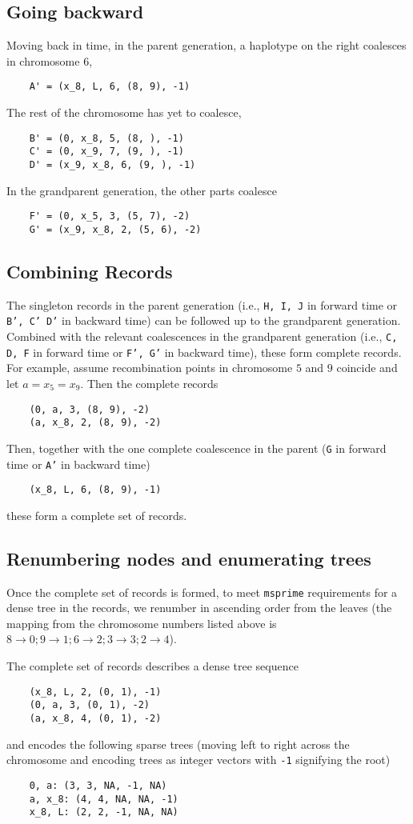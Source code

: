 \documentclass[12pt]{article}
\begin{document}
\subsection*{Going backward}
Moving back in time, in the parent generation, a haplotype on the right coalesces
in chromosome $6$,
\begin{verbatim}
	A' = (x_8, L, 6, (8, 9), -1)
\end{verbatim}
The rest of the chromosome has yet to coalesce,
\begin{verbatim}
	B' = (0, x_8, 5, (8, ), -1)
	C' = (0, x_9, 7, (9, ), -1)
	D' = (x_9, x_8, 6, (9, ), -1)
\end{verbatim}

In the grandparent generation, the other parts coalesce
\begin{verbatim}
	F' = (0, x_5, 3, (5, 7), -2)
	G' = (x_9, x_8, 2, (5, 6), -2)
\end{verbatim}

\subsection*{Combining Records}

The singleton records in the parent generation (i.e., {\tt H, I, J} in forward
time or {\tt B', C' D'} in backward time) can be followed up to the grandparent generation.
Combined with the relevant coalescences in the grandparent generation (i.e.,
{\tt C, D, F} in forward time or {\tt F', G'} in backward time), these form complete records.
For example, assume recombination points in chromosome $5$ and $9$ coincide and let $a = x_5 =x_9$.
Then the complete records
\begin{verbatim}
	(0, a, 3, (8, 9), -2)
	(a, x_8, 2, (8, 9), -2)
\end{verbatim}
Then, together with the one complete coalescence in the parent ({\tt G} in
forward time or {\tt A'} in backward time)
\begin{verbatim}
	(x_8, L, 6, (8, 9), -1)
\end{verbatim}
these form a complete set of records.


\subsection*{Renumbering nodes and enumerating trees}
Once the complete set of records is formed, to meet {\tt msprime} requirements
for a dense tree in the records, we renumber in ascending order from the leaves
(the mapping from the chromosome numbers listed above is $8 \to 0; 9 \to 1; 6
\to 2; 3 \to 3; 2 \to 4$).

The complete set of records describes a dense tree sequence
\begin{verbatim}
	(x_8, L, 2, (0, 1), -1)
	(0, a, 3, (0, 1), -2)
	(a, x_8, 4, (0, 1), -2)
\end{verbatim}
and encodes the following sparse trees (moving left to right across the
chromosome and encoding trees as integer vectors with {\tt -1} signifying the
root)
\begin{verbatim}
	0, a: (3, 3, NA, -1, NA)
	a, x_8: (4, 4, NA, NA, -1)
	x_8, L: (2, 2, -1, NA, NA)
\end{verbatim}
\end{document}
